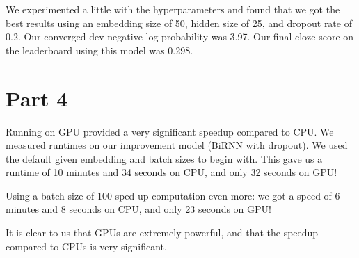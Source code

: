 \documentclass{article}
\begin{document}
We experimented a little with the hyperparameters and found that we got the best results using an embedding size of 50, hidden size of 25, and dropout rate of 0.2. Our converged dev negative log probability was 3.97. Our final cloze score on the leaderboard using this model was 0.298. 

\section{Part 4}

Running on GPU provided a very significant speedup compared to CPU. We measured runtimes on our improvement model (BiRNN with dropout). We used the default given embedding and batch sizes to begin with. This gave us a runtime of 10 minutes and 34 seconds on CPU, and only 32 seconds on GPU!

Using a batch size of 100 sped up computation even more: we got a speed of 6 minutes and 8 seconds on CPU, and only 23 seconds on GPU!

It is clear to us that GPUs are extremely powerful, and that the speedup compared to CPUs is very significant.
\end{document}
